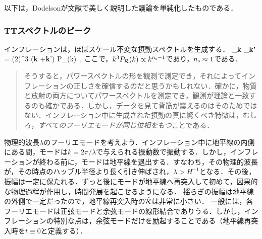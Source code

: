 以下は，Dodelsonが文献\cite{Dodelson:2003ip}で美しく説明した議論を単純化したものである．

\subsubsection{TTスペクトルのピーク}

インフレーションは，ほぼスケール不変な摂動スペクトルを生成する．
\beq
\langle \R_{\bf k} \R_{\bf k'} \rangle = (2\pi)^3 \delta ({\bf k} +{\bf k}') P_\R(k)\, ,
\eeq
ここで，$k^3 P_{\cal R}(k) \propto k^{n_{\rm s}-1}$であり，$n_{\rm s} \approx 1$である．
\begin{quote}
そうすると，パワースペクトルの形を観測で測定でき，それによってインフレーションの正しさを確信するのだと思うかもしれない．確かに，物質と放射の両方についてパワースペクトルを測定でき，観測が理論と一致するのも確かである．しかし，データを見て背筋が震えるのはそのためではない．インフレーション中に生成された摂動の真に驚くべき特徴は，むしろ，{\it すべてのフーリエモードが同じ位相をもつ}ことである\cite{Dodelson:2003ip}．
\end{quote}
物理的波長$\lambda$のフーリエモードを考えよう．インフレーション中に地平線の内側にある間，モードは$k = 2\pi/\lambda$で与えられる振動数で振動する．しかし，インフレーションが終わる前に，モードは地平線を退出する．すなわち，その物理的波長が，その時点のハッブル半径より長く引き伸ばされ，$\lambda > H^{-1}$となる．その後，振幅は一定に保たれる．ずっと後にモードが地平線へ再突入して初めて，因果的な物理過程が作用し，時間発展を起こせるようになる．
揺らぎの振幅は地平線の外側で一定だったので，地平線再突入時の$\dot {{\cal R}}$は非常に小さい．
一般には，各フーリエモードは正弦モードと余弦モードの線形結合でありうる．しかし，インフレーションの特別な点は，余弦モードだけを励起することである（地平線再突入時を$t \equiv 0$と定義する）．

